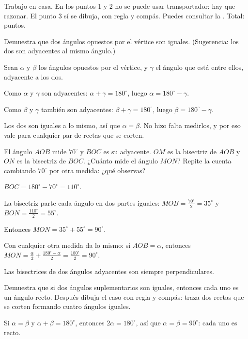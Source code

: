 \documentclass[11pt]{article}
\begin{document}
\encabezado

\begin{instrucciones}
Trabajo en casa. En los puntos 1 y 2 no se puede usar transportador: hay que razonar. El punto
3 sí se dibuja, con regla y compás. Puedes consultar la .
Total: \totalpuntos{} puntos.
\end{instrucciones}

\begin{preguntas}

\pregunta[1.5] Demuestra que dos ángulos opuestos por el vértice son iguales. (Sugerencia: los
dos son adyacentes al mismo ángulo.)
\begin{solucion}[5cm]
Sean $\alpha$ y $\beta$ los ángulos opuestos por el vértice, y $\gamma$ el ángulo que está
entre ellos, adyacente a los dos.

Como $\alpha$ y $\gamma$ son adyacentes: $\alpha + \gamma = 180^\circ$, luego
$\alpha = 180^\circ - \gamma$.

Como $\beta$ y $\gamma$ también son adyacentes: $\beta + \gamma = 180^\circ$, luego
$\beta = 180^\circ - \gamma$.

Los dos son iguales a lo mismo, así que $\alpha = \beta$. No hizo falta medirlos, y por eso
vale para cualquier par de rectas que se corten.
\end{solucion}

\pregunta[2] El ángulo $AOB$ mide $70^\circ$ y $BOC$ es su adyacente. $OM$ es la bisectriz de
$AOB$ y $ON$ es la bisectriz de $BOC$. ¿Cuánto mide el ángulo $MON$? Repite la cuenta cambiando
$70^\circ$ por otra medida: ¿qué observas?
\begin{solucion}[6cm]
$BOC = 180^\circ - 70^\circ = 110^\circ$.

La bisectriz parte cada ángulo en dos partes iguales: $MOB = \frac{70^\circ}{2} = 35^\circ$ y
$BON = \frac{110^\circ}{2} = 55^\circ$.

Entonces $MON = 35^\circ + 55^\circ = 90^\circ$.

Con cualquier otra medida da lo mismo: si $AOB = \alpha$, entonces
$MON = \frac{\alpha}{2} + \frac{180^\circ - \alpha}{2} = \frac{180^\circ}{2} = 90^\circ$.

Las bisectrices de dos ángulos adyacentes son siempre perpendiculares.
\end{solucion}

\pregunta[1.5] Demuestra que si dos ángulos suplementarios son iguales, entonces cada uno es un
ángulo recto. Después dibuja el caso con regla y compás: traza dos rectas que se corten
formando cuatro ángulos iguales.
\begin{solucion}[5cm]
Si $\alpha = \beta$ y $\alpha + \beta = 180^\circ$, entonces $2\alpha = 180^\circ$, así que
$\alpha = \beta = 90^\circ$: cada uno es recto.


\end{solucion}
\end{preguntas}
\end{document}
